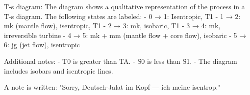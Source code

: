 T-s diagram:  
The diagram shows a qualitative representation of the process in a T-s diagram. The following states are labeled:  
- 0 → 1: Isentropic, T1  
- 1 → 2: mk (mantle flow), isentropic, T1  
- 2 → 3: mk, isobaric, T1  
- 3 → 4: mk, irreversible turbine  
- 4 → 5: mk + mm (mantle flow + core flow), isobaric  
- 5 → 6: jg (jet flow), isentropic  

Additional notes:  
- T0 is greater than TA.  
- S0 is less than S1.  
- The diagram includes isobars and isentropic lines.  

A note is written: "Sorry, Deutsch-Jalat im Kopf — ich meine isentrop."